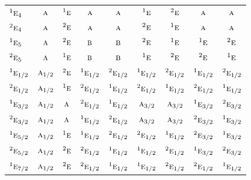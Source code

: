 \documentclass[10pt,a4paper]{article}
\numberwithin{equation}{section}
\newcommand{\irr}[1]{\text{\normalfont\scshape #1}}
\newcommand{\conjpair}[1]{{}^{#1}}
\begin{document}
{\begin{longtable}{@{}lcccccccc@{}}
$\conjpair{1}\irr{e}_{4}$ & $\irr{a}$ & $\conjpair{1}\irr{e}$ & $\irr{a}$ & $\irr{a}$ & $\conjpair{1}\irr{e}$ & $\conjpair{2}\irr{e}$ & $\irr{a}$ & $\irr{a}$\\
$\conjpair{2}\irr{e}_{4}$ & $\irr{a}$ & $\conjpair{2}\irr{e}$ & $\irr{a}$ & $\irr{a}$ & $\conjpair{2}\irr{e}$ & $\conjpair{1}\irr{e}$ & $\irr{a}$ & $\irr{a}$\\
$\conjpair{1}\irr{e}_{5}$ & $\irr{a}$ & $\conjpair{2}\irr{e}$ & $\irr{b}$ & $\irr{b}$ & $\conjpair{2}\irr{e}$ & $\conjpair{1}\irr{e}$ & $\conjpair{1}\irr{e}$ & $\conjpair{2}\irr{e}$\\
$\conjpair{2}\irr{e}_{5}$ & $\irr{a}$ & $\conjpair{1}\irr{e}$ & $\irr{b}$ & $\irr{b}$ & $\conjpair{1}\irr{e}$ & $\conjpair{2}\irr{e}$ & $\conjpair{2}\irr{e}$ & $\conjpair{1}\irr{e}$\\
$\conjpair{1}\irr{e}_{1/2}$ & $\irr{a}_{1/2}$ & $\conjpair{2}\irr{e}$ & $\conjpair{1}\irr{e}_{1/2}$ & $\conjpair{2}\irr{e}_{1/2}$ & $\conjpair{1}\irr{e}_{1/2}$ & $\conjpair{2}\irr{e}_{1/2}$ & $\conjpair{1}\irr{e}_{1/2}$ & $\conjpair{2}\irr{e}_{1/2}$\\
$\conjpair{2}\irr{e}_{1/2}$ & $\irr{a}_{1/2}$ & $\conjpair{1}\irr{e}$ & $\conjpair{2}\irr{e}_{1/2}$ & $\conjpair{1}\irr{e}_{1/2}$ & $\conjpair{2}\irr{e}_{1/2}$ & $\conjpair{1}\irr{e}_{1/2}$ & $\conjpair{2}\irr{e}_{1/2}$ & $\conjpair{1}\irr{e}_{1/2}$\\
$\conjpair{1}\irr{e}_{3/2}$ & $\irr{a}_{1/2}$ & $\irr{a}$ & $\conjpair{2}\irr{e}_{1/2}$ & $\conjpair{1}\irr{e}_{1/2}$ & $\irr{a}_{3/2}$ & $\irr{a}_{3/2}$ & $\conjpair{1}\irr{e}_{3/2}$ & $\conjpair{2}\irr{e}_{3/2}$\\
$\conjpair{2}\irr{e}_{3/2}$ & $\irr{a}_{1/2}$ & $\irr{a}$ & $\conjpair{1}\irr{e}_{1/2}$ & $\conjpair{2}\irr{e}_{1/2}$ & $\irr{a}_{3/2}$ & $\irr{a}_{3/2}$ & $\conjpair{2}\irr{e}_{3/2}$ & $\conjpair{1}\irr{e}_{3/2}$\\
$\conjpair{1}\irr{e}_{5/2}$ & $\irr{a}_{1/2}$ & $\conjpair{1}\irr{e}$ & $\conjpair{1}\irr{e}_{1/2}$ & $\conjpair{2}\irr{e}_{1/2}$ & $\conjpair{2}\irr{e}_{1/2}$ & $\conjpair{1}\irr{e}_{1/2}$ & $\conjpair{2}\irr{e}_{3/2}$ & $\conjpair{1}\irr{e}_{3/2}$\\
$\conjpair{2}\irr{e}_{5/2}$ & $\irr{a}_{1/2}$ & $\conjpair{2}\irr{e}$ & $\conjpair{2}\irr{e}_{1/2}$ & $\conjpair{1}\irr{e}_{1/2}$ & $\conjpair{1}\irr{e}_{1/2}$ & $\conjpair{2}\irr{e}_{1/2}$ & $\conjpair{1}\irr{e}_{3/2}$ & $\conjpair{2}\irr{e}_{3/2}$\\
$\conjpair{1}\irr{e}_{7/2}$ & $\irr{a}_{1/2}$ & $\conjpair{2}\irr{e}$ & $\conjpair{2}\irr{e}_{1/2}$ & $\conjpair{1}\irr{e}_{1/2}$ & $\conjpair{1}\irr{e}_{1/2}$ & $\conjpair{2}\irr{e}_{1/2}$ & $\conjpair{2}\irr{e}_{1/2}$ & $\conjpair{1}\irr{e}_{1/2}$\\

\end{longtable}}
\end{document}
